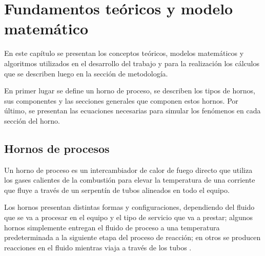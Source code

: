\chapter{Fundamentos teóricos y modelo matemático}

\par En este capítulo se presentan los conceptos teóricos, modelos matemáticos y algoritmos utilizados en el desarrollo del trabajo y para la realización los cálculos que se describen luego en la sección de metodología.
\par En primer lugar se define un horno de proceso, se describen los tipos de hornos, sus componentes y las secciones generales que componen estos hornos. Por último, se presentan las ecuaciones necesarias para simular los fenómenos en cada sección del horno.

\section{Hornos de procesos}
\par Un horno de proceso es un intercambiador de calor de fuego directo que utiliza los gases calientes de la combustión para elevar la temperatura de una corriente que fluye a través de un serpentín de tubos alineados en todo el equipo.
\par Los hornos presentan distintas formas y configuraciones, dependiendo del fluido que se va a procesar en el equipo y el tipo de servicio que va a prestar; algunos hornos simplemente entregan el fluido de proceso a una temperatura predeterminada a la siguiente etapa del proceso de reacción; en otros se producen reacciones en el fluido mientras viaja a través de los tubos \cite{bib:biset}.

